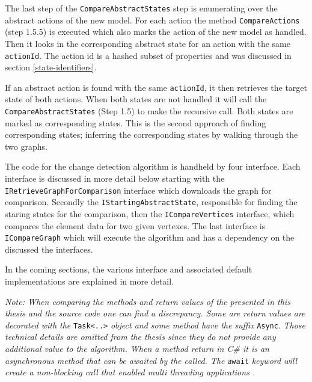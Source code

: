 The last step of the \verb|CompareAbstractStates| step is enumerating over the abstract actions of the new model. For each action the method \verb|CompareActions| (step 1.5.5) is executed which also marks the action of the new model as handled. Then it looks in the corresponding abstract state for an action with the same \verb|actionId|. The action id is a hashed subset of properties and was discussed in section \ref{state-identifiers}. 

If an abstract action is found with the same \verb|actionId|, it then retrieves the target state of both actions. When both states are not handled it will call the \verb|CompareAbstractStates| (Step 1.5) to make the recursive call. Both states are marked as corresponding states. This is the second approach of finding corresponding states; inferring the corresponding states by walking through the two graphs. 

The code for the change detection algorithm is handheld by four interface. Each interface is discussed in more detail below starting with the \verb|IRetrieveGraphForComparison| interface which downloads the graph for comparison. Secondly the \verb|IStartingAbstractState|, responsible for finding the staring states for the comparison, then the \verb|ICompareVertices| interface, which compares the element data for two given vertexes. The last interface is \verb|ICompareGraph| which will execute the algorithm and has a dependency on the discussed the interfaces. 

In the coming sections, the various interface and associated default implementations are explained in more detail.

\textit{Note: When comparing the methods and return values of the presented in this thesis and the source code one can find a discrepancy. Some are return values are decorated with the} \verb|Task<..>| \textit{object and some method have the suffix} \verb|Async|. \textit{Those technical details are omitted from the thesis since they do not provide any additional value to the algorithm. When a method return in C\# it is an asynchronous method that can be awaited by the called. The} \verb|await| \textit{keyword will create a non-blocking call that enabled multi threading applications \cite{asynchronous-programming}.}

\newpage


